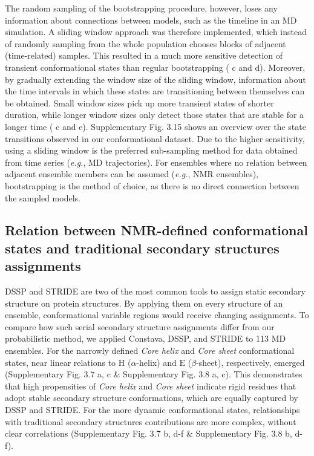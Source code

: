 The random sampling of the bootstrapping procedure, however, loses any information about connections between models, such as the timeline in an MD simulation. A sliding window approach was therefore implemented, which instead of randomly sampling from the whole population chooses blocks of adjacent (time-related) samples. This resulted in a much more sensitive detection of transient conformational states than regular bootstrapping ( c and d). Moreover, by gradually extending the window size of the sliding window, information about the time intervals in which these states are transitioning between themselves can be obtained. Small window sizes pick up more transient states of shorter duration, while longer window sizes only detect those states that are stable for a longer time ( c and e). 
Supplementary Fig. 3.15 shows an overview over the state transitions observed in our conformational dataset. Due to the higher sensitivity, using a sliding window is the preferred sub-sampling method for data obtained from time series (\textit{e.g.}, MD trajectories). For ensembles where no relation between adjacent ensemble members can be assumed (\textit{e.g.}, NMR ensembles), bootstrapping is the method of choice, as there is no direct connection between the sampled models.

\subsection{Relation between NMR-defined conformational states and traditional secondary structures assignments} 
\label{section:DSSP_vs_constava}


\parfillskip=0pt
DSSP \cite{touw_series_2015,kabsch_dictionary_1983} and STRIDE \cite{lovell_structure_2003,frishman_knowledge-based_1995} are two of the most common tools to assign static secondary structure on protein structures. By applying them on every structure of an ensemble, conformational variable regions would receive changing assignments. To compare how such serial secondary structure assignments differ from our probabilistic method, we applied Constava, DSSP, and STRIDE to 113 MD ensembles. For the narrowly defined \textit{Core helix} and \textit{Core sheet} conformational states, near linear relations to $\text{H}$ ($\alpha$-helix) and $\text{E}$ ($\beta$-sheet), respectively, emerged (Supplementary Fig. 3.7 a, c \& Supplementary Fig. 3.8 a, c).
This demonstrates that high propensities of \textit{Core helix} and \textit{Core sheet} indicate rigid residues that adopt stable secondary structure conformations, which are equally captured by DSSP and STRIDE. For the more dynamic conformational states, relationships with traditional secondary structures contributions are more complex, without clear correlations (Supplementary Fig. 3.7 b, d-f \& Supplementary Fig. 3.8 b, d-f).

